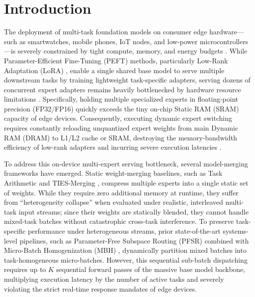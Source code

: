 \section{Introduction}
\label{sec:intro}

The deployment of multi-task foundation models on consumer edge hardware—such as smartwatches, mobile phones, IoT nodes, and low-power microcontrollers—is severely constrained by tight compute, memory, and energy budgets \cite{lane2015deep, zhou2019edge}. While Parameter-Efficient Fine-Tuning (PEFT) methods, particularly Low-Rank Adaptation (LoRA) \cite{hu2021lora}, enable a single shared base model to serve multiple downstream tasks by training lightweight task-specific adapters, serving dozens of concurrent expert adapters remains heavily bottlenecked by hardware resource limitations \cite{sheng2023slora, chen2023punica}. Specifically, holding multiple specialized experts in floating-point precision (FP32/FP16) quickly exceeds the tiny on-chip Static RAM (SRAM) capacity of edge devices. Consequently, executing dynamic expert switching requires constantly reloading unquantized expert weights from main Dynamic RAM (DRAM) to L1/L2 cache or SRAM, destroying the memory-bandwidth efficiency of low-rank adapters and incurring severe execution latencies \cite{chatterjee2024robustness, dettmers2023qlora}.

To address this on-device multi-expert serving bottleneck, several model-merging frameworks have emerged. Static weight-merging baselines, such as Task Arithmetic \cite{ilharco2022editing} and TIES-Merging \cite{yadav2023ties}, compress multiple experts into a single static set of weights. While they require zero additional memory at runtime, they suffer from ``heterogeneity collapse'' when evaluated under realistic, interleaved multi-task input streams; since their weights are statically blended, they cannot handle mixed-task batches without catastrophic cross-task interference. To preserve task-specific performance under heterogeneous streams, prior state-of-the-art systems-level pipelines, such as Parameter-Free Subspace Routing (PFSR) \cite{pfsr2025} combined with Micro-Batch Homogenization (MBH) \cite{mbh2025}, dynamically partition mixed batches into task-homogeneous micro-batches. However, this sequential sub-batch dispatching requires up to $K$ sequential forward passes of the massive base model backbone, multiplying execution latency by the number of active tasks and severely violating the strict real-time response mandates of edge devices.

